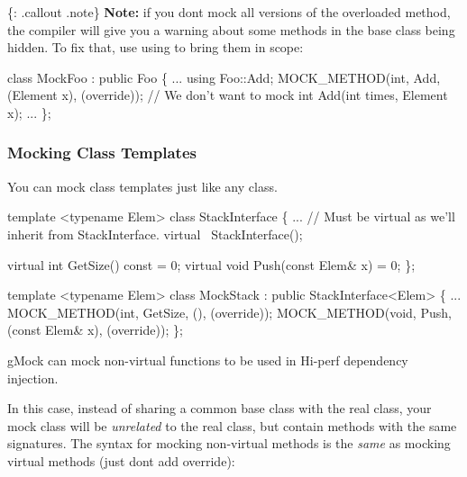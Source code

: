 \{\+: .callout .note\} {\bfseries Note\+:} if you don\textquotesingle{}t mock all versions of the overloaded method, the compiler will give you a warning about some methods in the base class being hidden. To fix that, use {\ttfamily using} to bring them in scope\+:


\begin{DoxyCode}
\textcolor{keyword}{class }MockFoo : \textcolor{keyword}{public} Foo \{
  ...
  \textcolor{keyword}{using} Foo::Add;
  MOCK\_METHOD(\textcolor{keywordtype}{int}, Add, (Element x), (\textcolor{keyword}{override}));
  \textcolor{comment}{// We don't want to mock int Add(int times, Element x);}
  ...
\};
\end{DoxyCode}


\subsubsection*{Mocking Class Templates}

You can mock class templates just like any class.


\begin{DoxyCode}
\textcolor{keyword}{template} <\textcolor{keyword}{typename} Elem>
\textcolor{keyword}{class }StackInterface \{
  ...
  \textcolor{comment}{// Must be virtual as we'll inherit from StackInterface.}
  \textcolor{keyword}{virtual} ~StackInterface();

  \textcolor{keyword}{virtual} \textcolor{keywordtype}{int} GetSize() \textcolor{keyword}{const} = 0;
  \textcolor{keyword}{virtual} \textcolor{keywordtype}{void} Push(\textcolor{keyword}{const} Elem& x) = 0;
\};

\textcolor{keyword}{template} <\textcolor{keyword}{typename} Elem>
\textcolor{keyword}{class }MockStack : \textcolor{keyword}{public} StackInterface<Elem> \{
  ...
  MOCK\_METHOD(\textcolor{keywordtype}{int}, GetSize, (), (\textcolor{keyword}{override}));
  MOCK\_METHOD(\textcolor{keywordtype}{void}, Push, (\textcolor{keyword}{const} Elem& x), (\textcolor{keyword}{override}));
\};
\end{DoxyCode}


g\+Mock can mock non-\/virtual functions to be used in Hi-\/perf dependency injection.

In this case, instead of sharing a common base class with the real class, your mock class will be {\itshape unrelated} to the real class, but contain methods with the same signatures. The syntax for mocking non-\/virtual methods is the {\itshape same} as mocking virtual methods (just don\textquotesingle{}t add {\ttfamily override})\+:


